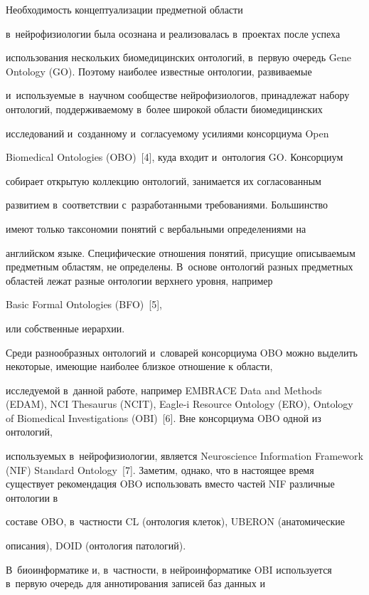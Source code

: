       Необходимость концептуализации предметной области 

в~нейрофизиологии была осознана и реализовалась в~проектах после успеха

 использования нескольких биомедицинских онтологий, в~первую очередь Gene Ontology (GO). Поэтому наиболее известные онтологии, развиваемые 

и~используемые в~научном сообществе нейрофизиологов, принадлежат набору онтологий, поддерживаемому в~более широкой области биомедицинских 

исследований и~созданному и~согласуемому усилиями консорциума Open 

Biomedical Ontologies (OBO)~[4], куда входит и~онтология GO. Консорциум 

собирает открытую коллекцию онтологий, занимается их согласованным 

развитием в~соответствии с~разработанными требованиями. Большинство 

имеют только таксономии понятий с вербальными определениями на 

английском языке. Специфические отношения понятий, присущие описываемым предметным областям, не определены. В~основе онтологий разных предметных областей лежат разные онтологии верхнего уровня, например 

Basic Formal Ontologies (BFO)~[5], 

или собственные иерархии.

      

      Среди разнообразных онтологий и~словарей консорциума OBO можно выделить некоторые, имеющие наиболее близкое отношение к области,

 исследуемой в~данной работе, например EMBRACE Data and Methods (EDAM), NCI Thesaurus (NCIT), Eagle-i Resource Ontology (ERO), Ontology of Biomedical Investigations (OBI)~[6]. Вне консорциума OBO одной из онтологий, 

используемых в~нейрофизиологии, является Neuroscience Information Framework (NIF) Standard Ontology~[7]. Заметим, однако, что в настоящее время существует рекомендация OBO использовать вместо частей NIF различные онтологии в 

составе OBO, в~частности CL (онтология клеток), UBERON (анатомические 

описания), DOID (онтология патологий).

      

 В~биоинформатике и, в~частности, в нейроинформатике OBI используется в~первую очередь для аннотирования записей баз данных и 

